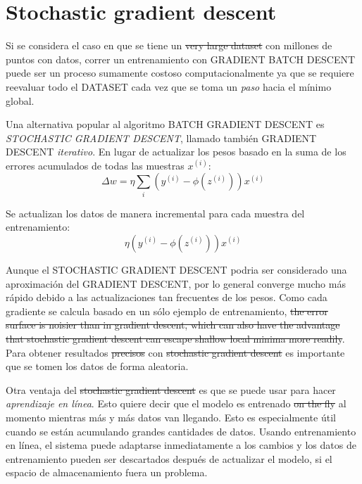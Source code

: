\section{Stochastic gradient descent}
Si se considera el caso en que se tiene un \sout{very large dataset} con millones
de puntos con datos, correr un entrenamiento con GRADIENT BATCH DESCENT puede ser
un proceso sumamente costoso computacionalmente ya que se requiere reevaluar
todo el DATASET cada vez que se toma un \textit{paso} hacia el mínimo global.

Una alternativa popular al algoritmo BATCH GRADIENT DESCENT es \textit{STOCHASTIC
  GRADIENT DESCENT}, llamado también GRADIENT DESCENT \textit{iterativo}. En lugar
de actualizar los pesos basado en la suma de los errores acumulados de todas las
muestras $x^{(i)}$:
\begin{equation}
  \Delta w = \eta \sum_i(y^{(i)} - \phi(z^{(i)}))x^{(i)}
\end{equation}

Se actualizan los datos de manera incremental para cada muestra del entrenamiento:
\begin{equation}
  \eta(y^{(i)} - \phi(z^{(i)}))x^{(i)}
\end{equation}

Aunque el STOCHASTIC GRADIENT DESCENT podria ser considerado una aproximación
del GRADIENT DESCENT, por lo general converge mucho más rápido debido a las
actualizaciones tan frecuentes de los pesos. Como cada gradiente se calcula
basado en un sólo ejemplo de entrenamiento, \sout{the error surface is noisier than in gradient descent, which can also have
the advantage that stochastic gradient descent can escape shallow local minima more
readily}. Para obtener resultados \sout{precisos} con \sout{stochastic gradient descent}
es importante que se tomen los datos de forma aleatoria.

Otra ventaja del \sout{stochastic gradient descent} es que se puede usar para
hacer \textit{aprendizaje en línea}. Esto quiere decir que el modelo es entrenado
\sout{on the fly} al momento mientras más y más datos van llegando. Esto es
especialmente útil cuando se están acumulando grandes cantidades de datos.
Usando entrenamiento en línea, el sistema puede adaptarse inmediatamente a
los cambios y los datos de entrenamiento pueden ser descartados después de
actualizar el modelo, si el espacio de almacenamiento fuera un problema.

